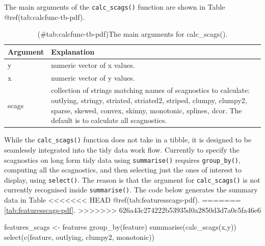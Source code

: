 The main arguments of the \texttt{calc\_scags()} function are shown in
Table @ref(tab:calcfunc-tb-pdf).

\begin{Schunk}
\begin{table}

\caption{(\#tab:calcfunc-tb-pdf)The main arguments for calc\_scags().}
\centering
\begin{tabular}[t]{>{\raggedright\arraybackslash}p{3cm}l}
\toprule
Argument & Explanation\\
\midrule
y & numeric vector of x values.\\
x & numeric vector of y values.\\
scags & collection of strings matching names of scagnostics to calculate: outlying, stringy, striated, striated2, striped, clumpy, clumpy2, sparse, skewed, convex, skinny, monotonic, splines, dcor. The default is to calculate all scagnostics.\\
\bottomrule
\end{tabular}
\end{table}

\end{Schunk}

While the \texttt{calc\_scags()} function does not take in a tibble, it
is designed to be seamlessly integrated into the tidy data work flow.
Currently to specify the scagnostics on long form tidy data using
\texttt{summarise()} requires \texttt{group\_by()}, computing all the
scagnostics, and then selecting just the ones of interest to display,
using \texttt{select()}. The reason is that the argument for
\texttt{calc\_scags()} is not currently recognised inside
\texttt{summarise()}. The code below generates the summary data in Table
<<<<<<< HEAD
@ref(tab:featuresscags-pdf).
=======
\ref{tab:featuresscags-pdf}.
>>>>>>> 626a43c274222b53935d0a2850d3d7a0c5fa46e6

\begin{Schunk}
\begin{Sinput}
features_scags <- features %
  group_by(feature) %
  summarise(calc_scags(x,y)) %
  select(c(feature, outlying, clumpy2, monotonic))
\end{Sinput}
\end{Schunk}

